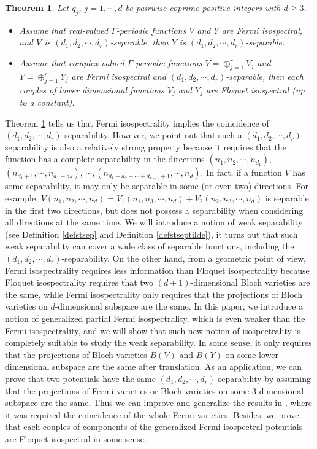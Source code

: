 \documentclass[12pt,letterpaper]{amsart}
\newtheorem{theorem}{Theorem}[section]
\begin{document}
\begin{theorem}\cite{liucpam}\label{theoliucpam}
	Let $q_j$, $j=1,\cdots,d$ be pairwise coprime positive integers with $d\geq 3$.
	\begin{itemize}
		\item[(I)] Assume that real-valued $\Gamma$-periodic functions $V$ and $Y$ are Fermi isospectral, and $V$ is $(d_1,d_2,\cdots,d_r)$-separable, then $Y$ is $(d_1,d_2,\cdots,d_r)$-separable.
		\item[(II)] Assume that complex-valued $\Gamma$-periodic functions $V=\oplus_{j=1}^rV_j$ and $Y=\oplus_{j=1}^rY_j$ are Fermi isospectral and $(d_1,d_2,\cdots,d_r)$-separable, then each couples of lower dimensional functions $V_j$ and $Y_j$ are Floquet isospectral {\rm(}up to a constant{\rm)}.
	\end{itemize}
\end{theorem}
Theorem \ref{theoliucpam} tells us that Fermi isospectrality implies the coincidence of $(d_1,d_2,\cdots,d_r)$-separability. However, we point out  that such a $(d_1,d_2,\cdots,d_r)$-separability is also a relatively strong property because it requires that the function has a complete separability in the directions $(n_1,n_2,\cdots,n_{d_1})$, $(n_{d_1+1},\cdots,n_{d_1+d_2})$, $\cdots,(n_{d_1+d_2+\cdots+d_{r-1}+1},\cdots,n_d)$. In fact, if a function $V$ has some separability, it may only be separable in some (or even two) directions. For example, $V(n_1,n_2,\cdots,n_d)=V_1(n_1,n_3,\cdots,n_d)+V_2(n_2,n_3,\cdots,n_d)$ is separable in the first two directions, but does not possess a separability when considering all directions at the same time. We will introduce a notion of weak separability (see Definition \ref{defstsep} and Definition \ref{defstseptilde}), it turns out that such weak separability
can cover a wide class of separable functions, including the $(d_1,d_2,\cdots,d_r)$-separability.
On the other hand, from a geometric point of view, Fermi isospectrality requires less information than Floquet isospectrality because Floquet isospectrality requires that two $(d+1)$-dimensional Bloch varieties are the same, while Fermi isospectrality only requires that the projections of Bloch varieties on $d$-dimensional subspace are the same. In this paper, we introduce a notion of generalized partial Fermi isospectrality, which is even weaker than the Fermi isospectrality, and we will show that such new notion of isospectrality is completely suitable to study the weak separability. In some sense, it only requires that the projections of Bloch varieties $B(V)$ and $B(Y)$ on some lower dimensional subspace are the same after translation.
As an application, we can prove that two potentials have the same $(d_1,d_2,\cdots,d_r)$-separability by assuming that the projections of Fermi varieties or  Bloch varieties on some $3$-dimensional subspace are the same. Thus we can improve and generalize  the results in \cite{liucpam}, where it was required the coincidence of the whole Fermi varieties. Besides, we prove that each couples of components of the generalized Fermi isospectral potentials are Floquet isospectral in some sense. 
\end{document}
